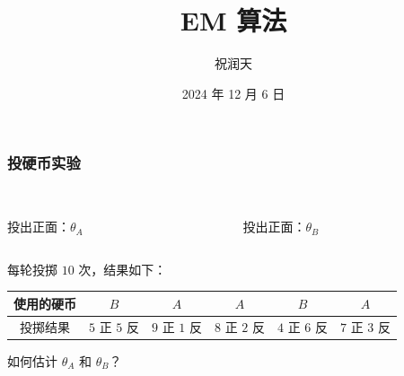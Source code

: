\documentclass{beamer}
\title{EM 算法}
\author{祝润天}
\institute{复旦大学计算机科学技术学院}
\date{2024 年 12 月 6 日}
\newcommand{\Gh}{\theta}
\begin{document}
\begin{frame}
    
    \maketitle

\end{frame}

\begin{frame}
    \frametitle{投硬币实验}

    \begin{columns}
        \begin{column}{0.5\textwidth}
            \centering
            \\投出正面：$\Gh_A$
        \end{column}
        \begin{column}{0.5\textwidth}
            \centering
            \\投出正面：$\Gh_B$
        \end{column}
    \end{columns}
    
    \pause

    \bigskip

    每轮投掷 $10$ 次，结果如下：

    \begin{table}
        \begin{tabular}{c|c|c|c|c|c}
            使用的硬币 & $B$ & $A$ & $A$ & $B$ & $A$ \\\hline
            投掷结果 & $5$ 正 $5$ 反 & $9$ 正 $1$ 反 & $8$ 正 $2$ 反 & $4$ 正 $6$ 反 & $7$ 正 $3$ 反
        \end{tabular}
    \end{table}

    \bigskip

    如何估计 $\Gh_A$ 和 $\Gh_B$？

\end{frame}
\end{document}
